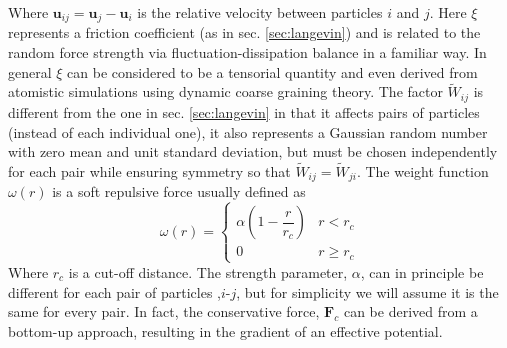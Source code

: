 \documentclass[twoside,openright,titlepage,numbers=noenddot,%
headinclude,footinclude,cleardoublepage=empty,abstract=on,
BCOR=5mm,fontsize=11pt, dvipsnames, paper=b5
]{scrreprt}
\renewcommand{\vec}[1]{\bm{#1}}
\newcommand{\pvel}{u}
\begin{document}
Where $\vec{\pvel}_{ij} = \vec{\pvel}_j - \vec{\pvel}_i$ is the relative velocity between particles $i$ and $j$. Here $\xi$ represents a friction coefficient (as in sec. \ref{sec:langevin}) and is related to the random force strength via fluctuation-dissipation balance in a familiar way\cite{Espanol1995}. In general $\xi$ can be considered to be a tensorial quantity and even derived from atomistic simulations using dynamic coarse graining theory\cite{Hijon2010}. The factor $\widetilde{W}_{ij}$ is different from the one in sec. \ref{sec:langevin} in that it affects pairs of particles (instead of each individual one), it also represents a Gaussian random number with zero mean and unit standard deviation, but must be chosen independently for each pair while ensuring symmetry so that $\widetilde{W}_{ij} = \widetilde{W}_{ji}$.
The weight function $\omega(r)$ is a soft repulsive force usually defined as
\begin{equation}
  \label{eq:dpdw}
  \omega(r) =
  \begin{cases}
    \alpha\left(1-\dfrac{r}{r_{c}}\right) & r<r_{c}\\
    0 & r\ge r_{c}
  \end{cases}
\end{equation}
Where $r_{c}$ is a cut-off distance. The strength parameter, $\alpha$, can in principle be different for each pair of particles ,$i$-$j$, but for simplicity we will assume it is the same for every pair. In fact, the conservative force, $\vec{F}_c$ can be derived from a bottom-up approach, resulting in the gradient of an effective potential\cite{Hijon2010}.
\end{document}
